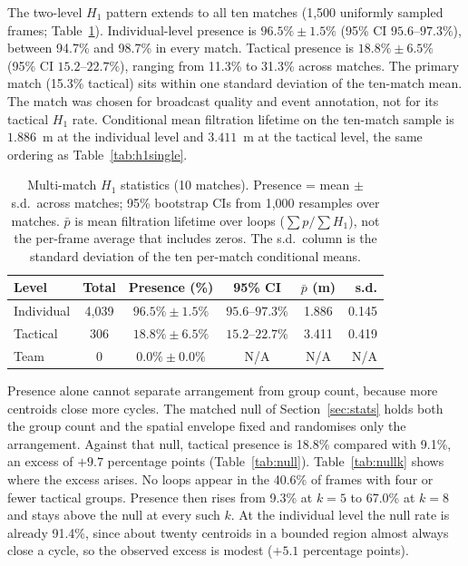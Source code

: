 The two-level $H_1$ pattern extends to all ten matches (1{,}500
uniformly sampled frames; Table~\ref{tab:h1multi}). Individual-level
presence is $96.5\%\pm1.5\%$ (95\% CI $95.6$--$97.3\%$), between 94.7\%
and 98.7\% in every match. Tactical presence is $18.8\%\pm6.5\%$ (95\%
CI $15.2$--$22.7\%$), ranging from 11.3\% to 31.3\% across matches. The
primary match (15.3\% tactical) sits within one standard deviation of
the ten-match mean. The match was chosen for broadcast quality and
event annotation, not for its tactical $H_1$ rate.
Conditional mean filtration lifetime on the ten-match sample is
$1.886$~m at the individual level and $3.411$~m at the tactical level,
the same ordering as Table~\ref{tab:h1single}.

\begin{table}[h]
\centering
\caption{Multi-match \texorpdfstring{$H_1$}{} statistics (10 matches).
Presence = mean \texorpdfstring{$\pm$}{} s.d.\ across matches; 95\%
bootstrap CIs from 1{,}000 resamples over matches.
$\bar{p}$ is mean filtration lifetime over loops
(\texorpdfstring{$\sum p / \sum H_1$}{}), not the per-frame average
that includes zeros. The s.d.\ column is the standard deviation of the
ten per-match conditional means.}
\label{tab:h1multi}
\begin{tabular}{@{}lccccr@{}}
\toprule
Level & Total & Presence (\%) & 95\% CI & $\bar{p}$ (m) & s.d. \\
\midrule
Individual & 4{,}039 & $96.5\%\pm1.5\%$ & $95.6$--$97.3\%$ & 1.886 & 0.145 \\
Tactical   & 306     & $18.8\%\pm6.5\%$ & $15.2$--$22.7\%$ & 3.411 & 0.419 \\
Team       & 0       & $0.0\%\pm0.0\%$  & N/A              & N/A   & N/A \\
\bottomrule
\end{tabular}
\end{table}

Presence alone cannot separate arrangement from group count, because
more centroids close more cycles. The matched null of
Section~\ref{sec:stats} holds both the group count and the spatial
envelope fixed and randomises only the arrangement. Against that null,
tactical presence is 18.8\% compared with 9.1\%, an excess of $+9.7$
percentage points (Table~\ref{tab:null}). Table~\ref{tab:nullk} shows
where the excess arises. No loops appear in the 40.6\% of frames with
four or fewer tactical groups. Presence then rises from 9.3\% at
$k=5$ to 67.0\% at $k=8$ and stays above the null at every such $k$.
At the individual level the null rate is already 91.4\%, since about
twenty centroids in a bounded region almost always close a cycle, so
the observed excess is modest ($+5.1$ percentage points).

